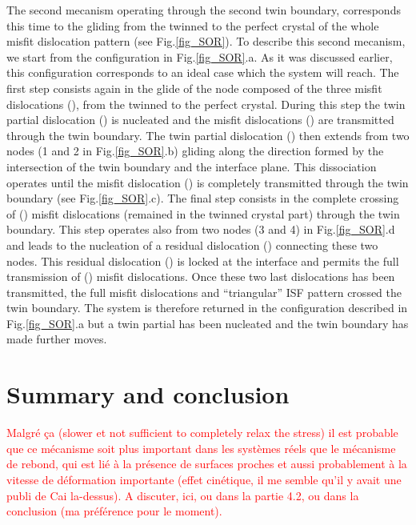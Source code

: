 \documentclass[final,3p,times,twocolumn]{elsarticle}
\begin{document}
The second mecanism operating through the second twin boundary, corresponds this time to the gliding from the twinned to the perfect crystal of the whole misfit dislocation pattern (see Fig.\ref{fig_SOR}). To describe this second mecanism, we start from the configuration in Fig.\ref{fig_SOR}.a. As it was discussed earlier, this configuration corresponds to an ideal case which the system will reach. The first step consists again in the glide of the node composed of the three misfit dislocations (), from the twinned to the perfect crystal. During this step the twin partial dislocation () is nucleated and the misfit dislocations () are transmitted through the twin boundary. The twin partial dislocation () then extends from two nodes (1 and 2 in Fig.\ref{fig_SOR}.b) gliding along the direction formed by the intersection of the twin boundary and the interface plane. This dissociation operates until the misfit dislocation () is completely transmitted through the twin boundary (see Fig.\ref{fig_SOR}.c). The final step consists in the complete crossing of () misfit dislocations (remained in the twinned crystal part) through the twin boundary. This step operates also from two nodes (3 and 4) in Fig.\ref{fig_SOR}.d and leads to the nucleation of a residual dislocation () connecting these two nodes. This residual dislocation () is locked at the interface and permits the full transmission of () misfit dislocations. Once these two last dislocations has been transmitted, the full misfit dislocations and ``triangular'' ISF pattern crossed the twin boundary. The system is therefore returned in the configuration described in Fig.\ref{fig_SOR}.a but a twin partial has been nucleated and the twin boundary has made further moves.

\section{Summary and conclusion}
\label{part_conclusion}

\textcolor{red}{Malgré ça (slower et not sufficient to completely relax the stress) il est probable que ce mécanisme soit plus important dans les systèmes réels que le mécanisme de rebond, qui est lié à la présence de surfaces proches et aussi probablement à la vitesse de déformation importante (effet cinétique, il me semble qu'il y avait une publi de Cai la-dessus). A discuter, ici, ou dans la partie 4.2, ou dans la conclusion (ma préférence pour le moment).}

\end{document}
